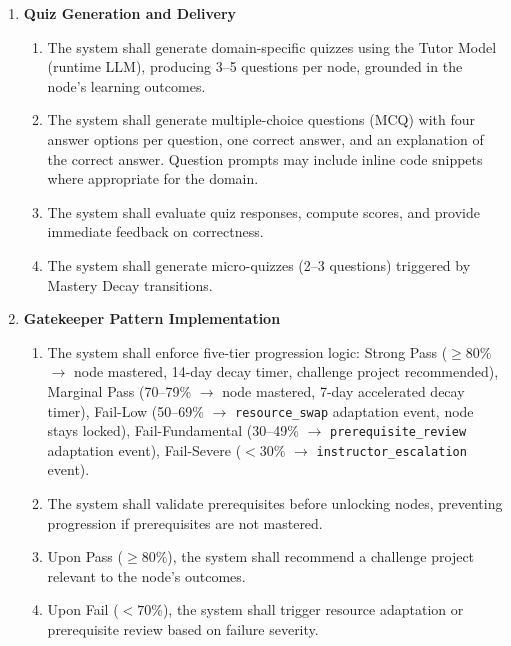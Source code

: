 \begin{enumerate}
    \item[\textbf{FR3:}] \textbf{Quiz Generation and Delivery}
        \begin{enumerate}
            \item[\textbf{FR3.1:}] The system shall generate domain-specific quizzes using the Tutor Model (runtime LLM), producing 3--5 questions per node, grounded in the node's learning outcomes.
            \item[\textbf{FR3.2:}] The system shall generate multiple-choice questions (MCQ) with four answer options per question, one correct answer, and an explanation of the correct answer. Question prompts may include inline code snippets where appropriate for the domain.
            \item[\textbf{FR3.3:}] The system shall evaluate quiz responses, compute scores, and provide immediate feedback on correctness.
            \item[\textbf{FR3.4:}] The system shall generate micro-quizzes (2--3 questions) triggered by Mastery Decay transitions.
        \end{enumerate}

    \item[\textbf{FR4:}] \textbf{Gatekeeper Pattern Implementation}
        \begin{enumerate}
            \item[\textbf{FR4.1:}] The system shall enforce five-tier progression logic: Strong Pass (\(\ge 80\%\) $\rightarrow$ node mastered, 14-day decay timer, challenge project recommended), Marginal Pass (70--79\% $\rightarrow$ node mastered, 7-day accelerated decay timer), Fail-Low (50--69\% $\rightarrow$ \texttt{resource\_swap} adaptation event, node stays locked), Fail-Fundamental (30--49\% $\rightarrow$ \texttt{prerequisite\_review} adaptation event), Fail-Severe (\(<30\%\) $\rightarrow$ \texttt{instructor\_escalation} event).
            \item[\textbf{FR4.2:}] The system shall validate prerequisites before unlocking nodes, preventing progression if prerequisites are not mastered.
            \item[\textbf{FR4.3:}] Upon Pass (\(\ge 80\%\)), the system shall recommend a challenge project relevant to the node's outcomes.
            \item[\textbf{FR4.4:}] Upon Fail (\(<70\%\)), the system shall trigger resource adaptation or prerequisite review based on failure severity.
        \end{enumerate}


\end{enumerate}

